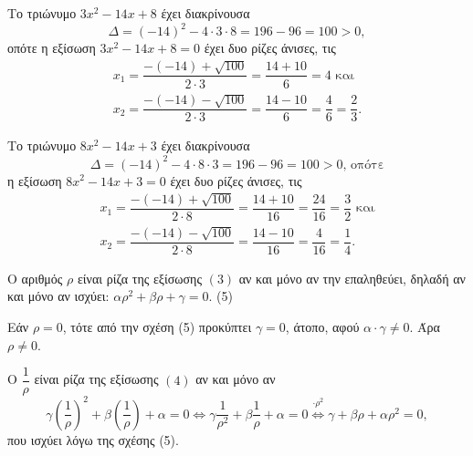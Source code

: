 
\begin{alist}
\item Το τριώνυμο $3x^2 - 14x + 8$ έχει διακρίνουσα
\[\Delta = (-14)^2 - 4 \cdot 3 \cdot 8 = 196 - 96 = 100 > 0,\]
οπότε η εξίσωση $3x^2 - 14x + 8 = 0$ έχει δυο ρίζες άνισες, τις
\begin{gather*}
x_1 = \dfrac{-(-14) + \sqrt{100}}{2 \cdot 3} = \dfrac{14 + 10}{6} = 4\text{ και} \\
x_2 = \dfrac{-(-14) - \sqrt{100}}{2 \cdot 3} = \dfrac{14 - 10}{6} = \dfrac{4}{6} = \dfrac{2}{3}.
\end{gather*}

Το τριώνυμο $8x^2 - 14x + 3$ έχει διακρίνουσα
\[\Delta = (-14)^2 - 4 \cdot 8 \cdot 3 = 196 - 96 = 100 > 0\text{, οπότε}\]
η εξίσωση $8x^2 - 14x + 3 = 0$ έχει δυο ρίζες άνισες, τις
\begin{gather*}
x_1 = \dfrac{-(-14) + \sqrt{100}}{2 \cdot 8} = \dfrac{14 + 10}{16} = \dfrac{24}{16} = \dfrac{3}{2}\text{ και} \\
x_2 = \dfrac{-(-14) - \sqrt{100}}{2 \cdot 8} = \dfrac{14 - 10}{16} = \dfrac{4}{16} = \dfrac{1}{4}.
\end{gather*}

\item Ο αριθμός $\rho$ είναι ρίζα της εξίσωσης $(3)$ αν και μόνο αν την επαληθεύει, δηλαδή αν και μόνο αν ισχύει: $\alpha\rho^2 + \beta\rho + \gamma = 0$. (5)
\begin{rlist}
\item Εάν $\rho = 0$, τότε από την σχέση (5) προκύπτει $\gamma = 0$, άτοπο, αφού $\alpha \cdot \gamma \ne 0$. Άρα $\rho \ne 0$.

\item Ο $\dfrac{1}{\rho}$ είναι ρίζα της εξίσωσης $(4)$ αν και μόνο αν
\[\gamma \left(\dfrac{1}{\rho}\right)^2 + \beta \left(\dfrac{1}{\rho}\right) + \alpha = 0 \Leftrightarrow \gamma \dfrac{1}{\rho^2} + \beta \dfrac{1}{\rho} + \alpha = 0 \stackrel{\cdot \rho^2}{\Leftrightarrow} \gamma + \beta\rho + \alpha\rho^2 = 0,\]
που ισχύει λόγω της σχέσης (5).
\end{rlist}
\end{alist}

